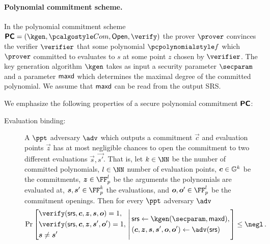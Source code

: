 \documentclass[runningheads,11pt]{llncs}
\begin{document}
\paragraph{Polynomial commitment scheme.}
\label{sec:poly_com}
In the polynomial commitment scheme $\PCOM = (\kgen, \com, \open, \verify)$ the
prover $\prover$ convinces the verifier $\verifier$ that some polynomial $\p{f}$
which $\prover$ committed to evaluates to $s$ at some point $z$ chosen by
$\verifier$.  The key generation algorithm $\kgen$ takes as input a security
parameter $\secparam$ and a parameter $\mathsf{maxd}$ which determines the maximal
degree of the committed polynomial. We assume that $\mathsf{maxd}$ can be read from
the output SRS.
  
We emphasize the following properties of a secure polynomial commitment
$\bm{\mathsf{PC}}$:
\begin{description}
\item[Evaluation binding:] A $\ppt$ adversary $\adv$ which outputs a commitment
  $\vec{c}$ and evaluation points $\vec{z}$ has at most negligible chances to
  open the commitment to two different evaluations $\vec{s}, \vec{s'}$. That is,
  let $k \in \NN$ be the number of committed polynomials, $l \in \NN$ number of
  evaluation points, $\vec{c} \in \GRP^k$ be the commitments,
  $\vec{z} \in \FF_p^l$ be the arguments the polynomials are evaluated at,
  $\vec{s},\vec{s}' \in \FF_p^k$ the evaluations, and
  $\vec{o},\vec{o}' \in \FF_p^l$ be the commitment openings. Then for every
  $\ppt$ adversary $\adv$
	\[
		\Pr
			\left[
			\begin{aligned}
				& \verify(\srs, \vec{c}, \vec{z}, \vec{s}, \vec{o}) = 1,  \\ 
				& \verify(\srs, \vec{c}, \vec{z}, \vec{s}', \vec{o}') = 1, \\
				& \vec{s} \neq \vec{s}'
			\end{aligned}
			\,\left|\,\vphantom{\begin{aligned}
                  & \\
                  & \\
                  &
                \end{aligned}}
			\begin{aligned}
				& \srs \gets \kgen(\secparam, \maxdeg),\\
				& (\vec{c}, \vec{z}, \vec{s}, \vec{s}', \vec{o}, \vec{o}') \gets \adv(\srs)
			\end{aligned}
			\right.\right] \leq \negl\,.
	\]

\end{description}
	
\end{document}
